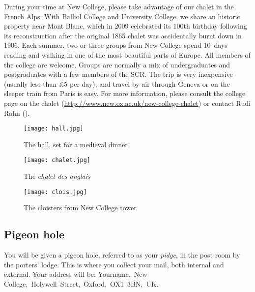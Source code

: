During your time at New College, please take advantage of our chalet in the
French Alps. With Balliol College and University College, we share an historic
property near Mont Blanc, which in 2009 celebrated its 100th birthday following
its reconstruction after the original 1865 chalet was accidentally burnt down in
1906. Each summer, two or three groups from New College spend 10~days reading
and walking in one of the most beautiful parts of Europe. All members of the college are welcome.
Groups are normally a mix of undergraduates and postgraduates with a few members
of the SCR. The trip is very inexpensive (usually less than \pounds5 per day), and
travel by air through Geneva or on the sleeper train from Paris is easy. For
more information, please consult the college page on the chalet
(\url{http://www.new.ox.ac.uk/new-college-chalet}) or contact Rudi Rahn
(\href{mailto:rudi.rahn@new.ox.ac.uk}{}).

\begin{figure}[htbp]
\centering
		\begin{minipage}{0.3\textwidth}
                \texttt{[image: hall.jpg]}
                \caption[Hall: Photo credit to Maureen Lenker]{The hall, set for
                a medieval dinner}
                \label{fig:hall}
        \end{minipage}%
        \quad
        \begin{minipage}{0.33\textwidth}
                \texttt{[image: chalet.jpg]}
                \caption[Chalet: Photo credit to Nick Altemose]{The
                \emph{cha\-let des ang\-lais}}
                \label{fig:chalet}
        \end{minipage}%
        \quad
        \begin{minipage}{0.3\textwidth}
                \texttt{[image: clois.jpg]}
                \caption[Cloisters: Photo credit to Alex Graham]{The cloisters
                from New College tower}
                \label{fig:clois}
        \end{minipage}%
\end{figure}

\subsection{Pigeon hole}

You will be given a pigeon hole, referred to as your \emph{pidge}, in the post
room by the porters' lodge. This is where you collect your mail, both internal and external. Your address will be: Yourname,~New College,~Holywell~Street,~Oxford,~OX1~3BN,~UK.

